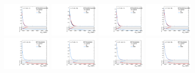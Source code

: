 \begin{figure}[htbp]
  \centering
  \includegraphics[width=0.21\textwidth]{fig/uncertainties/systs_res_e_LP_nobb_LDy_MVVScaleBinW_ProjX.pdf}
  \includegraphics[width=0.21\textwidth]{fig/uncertainties/systs_res_e_LP_nobb_HDy_MVVScaleBinW_ProjX.pdf}
  \includegraphics[width=0.21\textwidth]{fig/uncertainties/systs_res_e_LP_nobb_LDy_MVVScaleBinTop_ProjX.pdf}
  \includegraphics[width=0.21\textwidth]{fig/uncertainties/systs_res_e_LP_nobb_HDy_MVVScaleBinTop_ProjX.pdf}\\
  \includegraphics[width=0.21\textwidth]{fig/uncertainties/systs_res_e_HP_nobb_LDy_MVVTail_ProjX.pdf}
  \includegraphics[width=0.21\textwidth]{fig/uncertainties/systs_res_e_LP_nobb_LDy_MVVTail_ProjX.pdf}
  \includegraphics[width=0.21\textwidth]{fig/uncertainties/systs_res_e_HP_nobb_HDy_MVVTail_ProjX.pdf}
  \includegraphics[width=0.21\textwidth]{fig/uncertainties/systs_res_e_LP_nobb_HDy_MVVTail_ProjX.pdf}\\

\end{figure}
